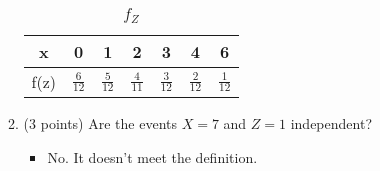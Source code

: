 \documentclass[11pt]{article}
\begin{document}
\begin{enumerate}
\begin{enumerate}
		\begin{table}[h!]
			\begin{center}
			\caption{$f_Z$}
				\begin{tabular}{|c|c|c|c|c|c|c|}
				\hline
				x & 0 & 1 & 2 & 3 & 4 & 6\\ 
				\hline
				f(z) & $\frac{6}{12}$ & $\frac{5}{12}$ & $\frac{4}{11}$ & $\frac{3}{12}$ & $\frac{2}{12}$ & $\frac{1}{12}$ \\ 
				\hline
				\end{tabular}
			\label{ }
			\end{center}
		\end{table} 
	 
	 \item (3 points) Are the events $X =7$ and $Z=1$ independent?
	 
	 \begin{itemize}
	 
	 	\item No. It doesn't meet the definition.
	 
	 \end{itemize}
	 
	\end{enumerate}
\end{enumerate}
\end{document}
